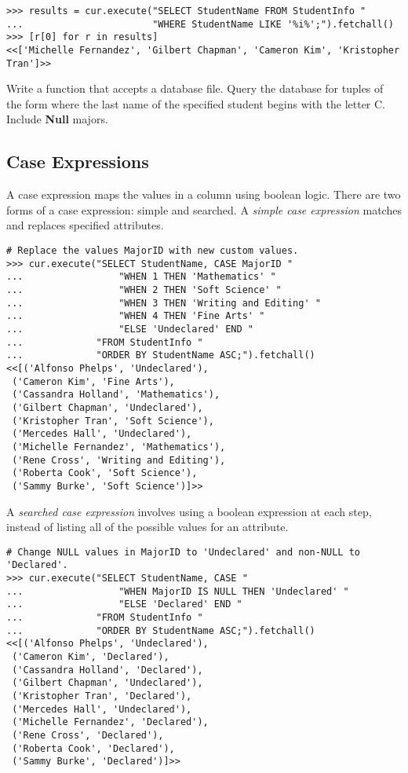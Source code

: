\begin{lstlisting}
>>> results = cur.execute("SELECT StudentName FROM StudentInfo "
...                       "WHERE StudentName LIKE '%i%';").fetchall()
>>> [r[0] for r in results]
<<['Michelle Fernandez', 'Gilbert Chapman', 'Cameron Kim', 'Kristopher Tran']>>
\end{lstlisting}

\begin{problem} %
Write a function that accepts a database file.
Query the database for tuples of the form  where the last name of the specified student begins with the letter C.
Include \textbf{Null} majors.
\end{problem}

\subsection*{Case Expressions} %

A case expression maps the values in a column using boolean logic.
There are two forms of a case expression: simple and searched.
A \emph{simple case expression} matches and replaces specified attributes.

\begin{lstlisting}
# Replace the values MajorID with new custom values.
>>> cur.execute("SELECT StudentName, CASE MajorID "
...                 "WHEN 1 THEN 'Mathematics' "
...                 "WHEN 2 THEN 'Soft Science' "
...                 "WHEN 3 THEN 'Writing and Editing' "
...                 "WHEN 4 THEN 'Fine Arts' "
...                 "ELSE 'Undeclared' END "
...             "FROM StudentInfo "
...             "ORDER BY StudentName ASC;").fetchall()
<<[('Alfonso Phelps', 'Undeclared'),
 ('Cameron Kim', 'Fine Arts'),
 ('Cassandra Holland', 'Mathematics'),
 ('Gilbert Chapman', 'Undeclared'),
 ('Kristopher Tran', 'Soft Science'),
 ('Mercedes Hall', 'Undeclared'),
 ('Michelle Fernandez', 'Mathematics'),
 ('Rene Cross', 'Writing and Editing'),
 ('Roberta Cook', 'Soft Science'),
 ('Sammy Burke', 'Soft Science')]>>
\end{lstlisting}

A \emph{searched case expression} involves using a boolean expression at each step, instead of listing all of the possible values for an attribute.

\begin{lstlisting}
# Change NULL values in MajorID to 'Undeclared' and non-NULL to 'Declared'.
>>> cur.execute("SELECT StudentName, CASE "
...                 "WHEN MajorID IS NULL THEN 'Undeclared' "
...                 "ELSE 'Declared' END "
...             "FROM StudentInfo "
...             "ORDER BY StudentName ASC;").fetchall()
<<[('Alfonso Phelps', 'Undeclared'),
 ('Cameron Kim', 'Declared'),
 ('Cassandra Holland', 'Declared'),
 ('Gilbert Chapman', 'Undeclared'),
 ('Kristopher Tran', 'Declared'),
 ('Mercedes Hall', 'Undeclared'),
 ('Michelle Fernandez', 'Declared'),
 ('Rene Cross', 'Declared'),
 ('Roberta Cook', 'Declared'),
 ('Sammy Burke', 'Declared')]>>
\end{lstlisting}

